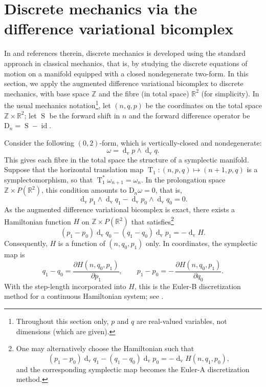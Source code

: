 \documentclass[11pt]{article} %
\numberwithin{equation}{section}
\newcommand{\es}{\operatorname{S}}
\newcommand{\te}{\operatorname{T}}
\newcommand{\id}{\operatorname{id}}
\newcommand{\upd}{\operatorname{d}}
\newcommand{\upv}{\operatorname{v}}
\newcommand{\dv}{\upd_{\upv}\!}
\newcommand{\diffn}{\mathrm{D}_{n}}
\theoremstyle{plain}
\theoremstyle{definition}
\begin{document}
\section{Discrete mechanics via the difference variational bicomplex}
\label{sec:hasy}
In \cite{MaWe2001} and references therein, discrete mechanics is
developed using the standard approach in classical mechanics, that is,
by studying the discrete equations of motion on a manifold equipped with a
closed nondegenerate two-form. In this section, we apply the augmented difference  variational
bicomplex to discrete mechanics, with base space $\mathbb{Z}$ and the fibre (in total space) $\mathbb{R}^2$ (for simplicity). In the usual mechanics notation\footnote{Throughout this section only, $p$ and $q$ are real-valued variables, not dimensions (which are given).}, let $(n,q,p)$
be the coordinates on the total space $\mathbb{Z}\times \mathbb{R}^2$; let $\es$ be the forward shift in $n$ and the forward difference operator be $\diffn=\es-\id$.

Consider the following $(0,2)$-form, which is vertically-closed and nondegenerate:
\begin{equation}
\omega =\dv p\wedge \dv q.
\end{equation}
This gives each fibre in the total space the structure of a symplectic manifold. Suppose that
the horizontal translation map $\te_1:(n,p,q)\mapsto(n+1,p,q)$ is a symplectomorphism, so that $\te_1^*\omega_{n+1}=\omega_n$. In the prolongation space $\mathbb{Z}\times P(\mathbb{R}^2)$, this condition amounts to $\diffn\omega=0$, that is,
\[
\dv p_1\wedge \dv q_1-\dv p_0\wedge \dv q_0=0.
\]
As the augmented difference  variational bicomplex is exact, there exists a Hamiltonian function $H$ on $\mathbb{Z}\times P(\mathbb{R}^2)$ that satisfies\footnote{One may alternatively choose the Hamiltonian such that
\begin{equation*}
    (p_1-p_0) \dv q_1-(q_1-q_0) \dv p_0 =-\dv H(n,q_1,p_0),
\end{equation*}
and the corresponding symplectic map becomes the Euler-A discretization method.
}
\begin{equation}
(p_1-p_0) \dv q_0-(q_1-q_0) \dv p_1 =-\dv H.
\end{equation}
Consequently, $H$ is a function of $(n,q_0,p_1)$ only. In coordinates, the
symplectic map is
\begin{equation}
\label{eq:flow}
q_1-q_0=\frac{\partial H(n,q_0,p_1)}{\partial p_1},\qquad
p_1-p_0=-\,\frac{\partial H(n,q_0,p_1)}{\partial q_0}.
\end{equation}
With the step-length incorporated into $H$, this is the Euler-B discretization method for a continuous
Hamiltonian system; see \cite{LeRe2004}.
\end{document}

